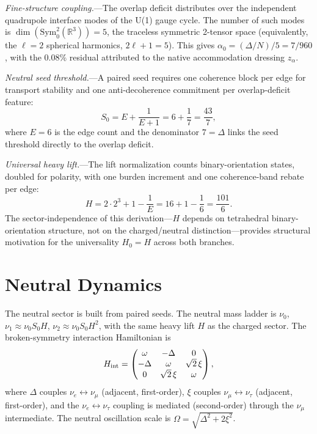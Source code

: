 \documentclass[11pt,twocolumn]{article}
\begin{document}
\emph{Fine-structure coupling.}---The overlap deficit distributes over the independent quadrupole interface modes of the U(1) gauge cycle.
The number of such modes is $\dim(\mathrm{Sym}^2_0(\mathbb{R}^3)) = 5$, the traceless symmetric 2-tensor space (equivalently, the $\ell = 2$ spherical harmonics, $2\ell + 1 = 5$).
This gives $\alpha_0 = (\Delta/N)/5 = 7/960$, with the 0.08\% residual attributed to the native accommodation dressing $z_\alpha$.

\emph{Neutral seed threshold.}---A paired seed requires one coherence block per edge for transport stability and one anti-decoherence commitment per overlap-deficit feature:
\begin{equation}
\label{eq:S0-deriv}
S_0 = E + \frac{1}{E + 1} = 6 + \frac{1}{7} = \frac{43}{7},
\end{equation}
where $E = 6$ is the edge count and the denominator $7 = \Delta$ links the seed threshold directly to the overlap deficit.

\emph{Universal heavy lift.}---The lift normalization counts binary-orientation states, doubled for polarity, with one burden increment and one coherence-band rebate per edge:
\begin{equation}
\label{eq:H-deriv}
H = 2 \cdot 2^3 + 1 - \frac{1}{E} = 16 + 1 - \frac{1}{6} = \frac{101}{6}.
\end{equation}
The sector-independence of this derivation---$H$ depends on tetrahedral binary-orientation structure, not on the charged/neutral distinction---provides structural motivation for the universality $H_0 = H$ across both branches.


\section{Neutral Dynamics}
\label{sec:neutral}

The neutral sector is built from paired seeds.
The neutral mass ladder is $\nu_0$, $\nu_1 \approx \nu_0 S_0 H$, $\nu_2 \approx \nu_0 S_0 H^2$, with the same heavy lift $H$ as the charged sector.
The broken-symmetry interaction Hamiltonian is
\begin{equation}
\label{eq:neutral-hamiltonian}
H_{\rm int} = \begin{pmatrix} \omega & -\Delta & 0 \\ -\Delta & \omega & \sqrt{2}\,\xi \\ 0 & \sqrt{2}\,\xi & \omega \end{pmatrix},
\end{equation}
where $\Delta$ couples $\nu_e \leftrightarrow \nu_\mu$ (adjacent, first-order), $\xi$ couples $\nu_\mu \leftrightarrow \nu_\tau$ (adjacent, first-order), and the $\nu_e \leftrightarrow \nu_\tau$ coupling is mediated (second-order) through the $\nu_\mu$ intermediate.
The neutral oscillation scale is $\Omega = \sqrt{\Delta^2 + 2\xi^2}$.
\end{document}
